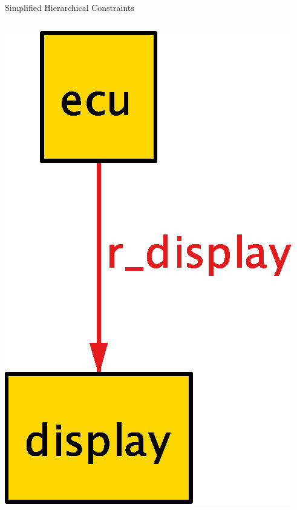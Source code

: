 \documentclass[table,15pt,t]{beamer}
\newcounter{i}
\begin{document}
\begin{frame}{Simplified Hierarchical Constraints}
\begin{columns}
\begin{column}{0.5\textwidth}
      \includegraphics[scale=0.5]{figs/parent-new}
    \end{column}
  \end{columns}
\end{frame}
\end{document}
